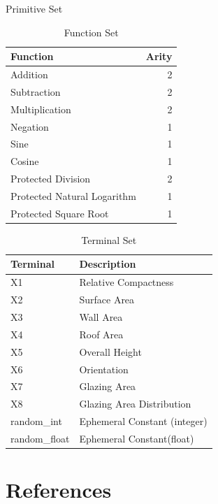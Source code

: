 \documentclass[
  ignorenonframetext,
]{beamer}
\begin{document}
\begin{frame}[allowframebreaks]{Primitive Set}
\protect\hypertarget{primitive-set}{}
\begin{table}

\caption{\label{tab:primitive_table}Function Set}
\centering
\begin{tabular}[t]{l|r}
\hline
Function & Arity\\
\hline
Addition & 2\\
\hline
Subtraction & 2\\
\hline
Multiplication & 2\\
\hline
Negation & 1\\
\hline
Sine & 1\\
\hline
Cosine & 1\\
\hline
Protected Division & 2\\
\hline
Protected Natural Logarithm & 1\\
\hline
Protected Square Root & 1\\
\hline
\end{tabular}
\end{table}
\framebreak

\begin{table}

\caption{\label{tab:function_table}Terminal Set}
\centering
\begin{tabular}[t]{l|l}
\hline
Terminal & Description\\
\hline
X1 & Relative Compactness\\
\hline
X2 & Surface Area\\
\hline
X3 & Wall Area\\
\hline
X4 & Roof Area\\
\hline
X5 & Overall Height\\
\hline
X6 & Orientation\\
\hline
X7 & Glazing Area\\
\hline
X8 & Glazing Area Distribution\\
\hline
random\_int & Ephemeral Constant (integer)\\
\hline
random\_float & Ephemeral Constant(float)\\
\hline
\end{tabular}
\end{table}
\end{frame}

\hypertarget{references}{%
\section*{References}\label{references}}
\end{document}

